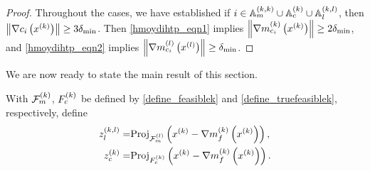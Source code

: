 \begin{proof}



Throughout the cases, we have established if $i \in {\mathbb A_m^{(k, k)}} \cup {\mathbb A_c^{(k)}} \cup {\mathbb A_l^{(k, l)}}$, then $\left\| \nabla c_i\left(x^{(k)}\right) \right\| \ge 3 {\delta_{\textrm{min}}}$.
Then \cref{hmoydihtp_eqn1} implies $\left\|{\nabla m_{c_i}^{(k)}\left(x^{(k)}\right)}\right\| \ge 2 {\delta_{\textrm{min}}}$, 
and \cref{hmoydihtp_eqn2} implies $\left\|{\nabla m_{c_i}^{(l)}\left({x^{(l)}}\right)}\right\| \ge {\delta_{\textrm{min}}}$.
\end{proof}

% 
% 


We are now ready to state the main result of this section.   

With ${\mathcal F_m^{(k)}}$, ${F_c^{(k)}}$ be defined by \cref{define_feasiblek} and \cref{define_truefeasiblek}, respectively, define
\begin{align}
{z_l^{(k, l)}} =& {\textrm{Proj}}_{{\mathcal F_m^{(l)}}}\left(x^{(k)} - {\nabla m_f^{(k)}\left(x^{(k)}\right)}\right), \label{define_zlk} \\
{z_c^{(k)}} =& {\textrm{Proj}}_{{F_c^{(k)}}}\left(x^{(k)} - {\nabla m_f^{(k)}\left(x^{(k)}\right)}\right). \label{define_zck}
\end{align}



